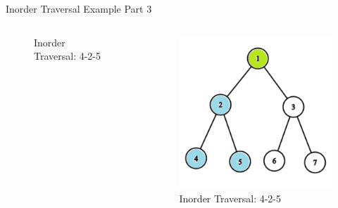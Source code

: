 \documentclass[aspectratio=169]{beamer}%
\begin{document}
\begin{frame}{Inorder Traversal Example Part 3}
\begin{columns}
\begin{column}{0.32\textwidth}
\begin{figure}
                \caption{Inorder Traversal: 4-2-5}
            \end{figure}
        \end{column}
        \hfill
        \begin{column}{0.32\textwidth}
            \begin{figure}
                \centering
                \includegraphics[width = .9\linewidth]{tree-in 9.png}
                \caption{Inorder Traversal: 4-2-5}
            \end{figure}
        \end{column}
    \end{columns}
\end{frame}
\end{document}
